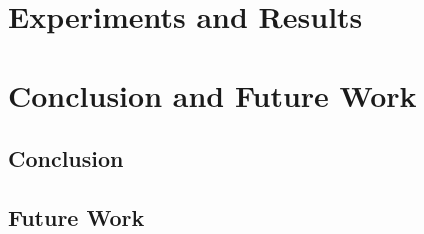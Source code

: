 \chapter{Experiments and Results}
\label{sec:experiments_results}

\lipsum[2-4]

\chapter{Conclusion and Future Work}
\label{sec:conclusion_future_work}
\lipsum[1]
\section{Conclusion}
\lipsum[5-6]
\section{Future Work}
\lipsum[7-8]


